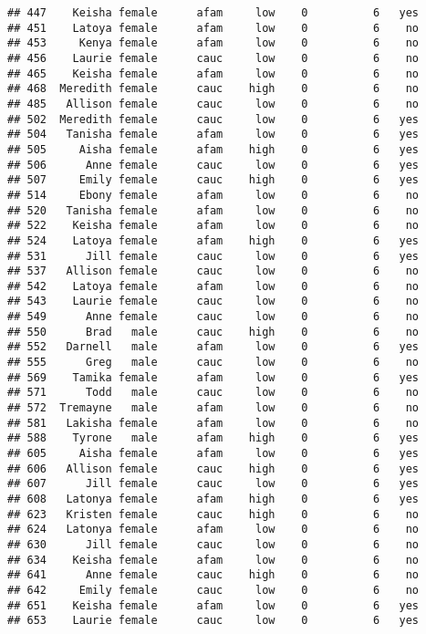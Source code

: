 \documentclass[
]{article}
\begin{document}
\begin{verbatim}
## 447    Keisha female      afam     low    0          6   yes
## 451    Latoya female      afam     low    0          6    no
## 453     Kenya female      afam     low    0          6    no
## 456    Laurie female      cauc     low    0          6    no
## 465    Keisha female      afam     low    0          6    no
## 468  Meredith female      cauc    high    0          6    no
## 485   Allison female      cauc     low    0          6    no
## 502  Meredith female      cauc     low    0          6   yes
## 504   Tanisha female      afam     low    0          6   yes
## 505     Aisha female      afam    high    0          6   yes
## 506      Anne female      cauc     low    0          6   yes
## 507     Emily female      cauc    high    0          6   yes
## 514     Ebony female      afam     low    0          6    no
## 520   Tanisha female      afam     low    0          6    no
## 522    Keisha female      afam     low    0          6    no
## 524    Latoya female      afam    high    0          6   yes
## 531      Jill female      cauc     low    0          6   yes
## 537   Allison female      cauc     low    0          6    no
## 542    Latoya female      afam     low    0          6    no
## 543    Laurie female      cauc     low    0          6    no
## 549      Anne female      cauc     low    0          6    no
## 550      Brad   male      cauc    high    0          6    no
## 552   Darnell   male      afam     low    0          6   yes
## 555      Greg   male      cauc     low    0          6    no
## 569    Tamika female      afam     low    0          6   yes
## 571      Todd   male      cauc     low    0          6    no
## 572  Tremayne   male      afam     low    0          6    no
## 581   Lakisha female      afam     low    0          6    no
## 588    Tyrone   male      afam    high    0          6   yes
## 605     Aisha female      afam     low    0          6   yes
## 606   Allison female      cauc    high    0          6   yes
## 607      Jill female      cauc     low    0          6   yes
## 608   Latonya female      afam    high    0          6   yes
## 623   Kristen female      cauc    high    0          6    no
## 624   Latonya female      afam     low    0          6    no
## 630      Jill female      cauc     low    0          6    no
## 634    Keisha female      afam     low    0          6    no
## 641      Anne female      cauc    high    0          6    no
## 642     Emily female      cauc     low    0          6    no
## 651    Keisha female      afam     low    0          6   yes
## 653    Laurie female      cauc     low    0          6   yes

\end{verbatim}
\end{document}
